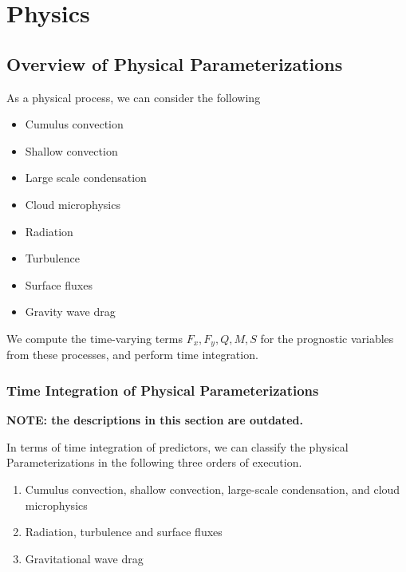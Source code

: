 \hypertarget{physics}{%
\section{Physics}\label{physics}}

\hypertarget{overview-of-physical-parameterizations}{%
\subsection{Overview of Physical
Parameterizations}\label{overview-of-physical-parameterizations}}

As a physical process, we can consider the following

\begin{itemize}
\tightlist
\item
  Cumulus convection
\item
  Shallow convection
\item
  Large scale condensation
\item
  Cloud microphysics
\item
  Radiation
\item
  Turbulence
\item
  Surface fluxes
\item
  Gravity wave drag
\end{itemize}

We compute the time-varying terms \(F_x, F_y, Q, M, S\) for the
prognostic variables from these processes, and perform time integration.

\hypertarget{time-integration-of-physical-parameterizations}{%
\subsubsection{Time Integration of Physical
Parameterizations}\label{time-integration-of-physical-parameterizations}}

\textbf{NOTE: the descriptions in this section are outdated.}

In terms of time integration of predictors, we can classify the physical
Parameterizations in the following three orders of execution.

\begin{enumerate}
\def\labelenumi{\arabic{enumi}.}
\item
  Cumulus convection, shallow convection, large-scale condensation, and
  cloud microphysics
\item
  Radiation, turbulence and surface fluxes
\item
  Gravitational wave drag
\end{enumerate}

